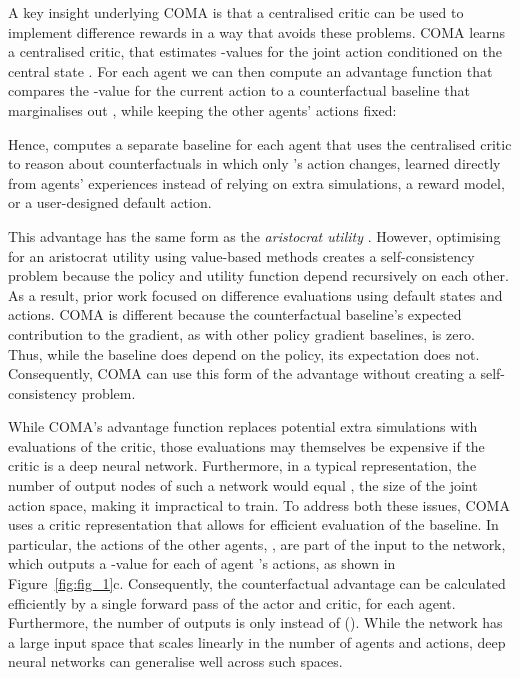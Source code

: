 \documentclass[letterpaper]{article}
\newcommand{\citep}{\cite}
\begin{document}
A key insight underlying COMA is that a centralised critic can be used to 
implement difference rewards in a way that avoids these problems.  COMA learns 
a centralised critic,  that estimates -values for the joint 
action  conditioned on the central state . For each agent  we can 
then compute an advantage function that compares the -value for the current 
action  to a counterfactual baseline that marginalises out , while 
keeping the other agents' actions  fixed:

Hence,  computes a separate baseline for each agent that uses the 
centralised critic to reason about counterfactuals in which only 's action 
changes, learned directly from agents' experiences instead of relying on extra 
simulations, a reward model, or a user-designed default action.

This advantage has the same form as the \emph{aristocrat utility} 
\citep{wolpert2002optimal}. However, optimising for an aristocrat utility using 
value-based methods creates a self-consistency problem because the policy and utility 
function depend recursively on each other. As a result, prior work focused
on difference evaluations using default states and actions. COMA is different because the
 counterfactual baseline's expected contribution to the gradient, as with other policy gradient baselines, is zero.  Thus, while
the baseline does depend on the policy, its expectation does not. Consequently, COMA can use 
this form of the advantage without creating a self-consistency problem.

While COMA's advantage function replaces potential extra simulations with 
evaluations of the critic, those evaluations may themselves be expensive if the 
critic is a deep neural network.  Furthermore, in a typical representation, the 
number of output nodes of such a network would equal , the 
size of the joint action space, making it impractical to train.  To address 
both these issues, COMA uses a critic representation that allows for efficient 
evaluation of the baseline. In particular, the actions of the other agents, 
, are part of the input to the network, which outputs a -value 
for each of agent 's actions, as shown in Figure~\ref{fig:fig_1}c. 
Consequently, the counterfactual advantage can be calculated efficiently by a 
single forward pass of the actor and critic, for each agent. Furthermore, the 
number of outputs is only  instead of (). 
While the network has a large input space that scales linearly in the number of 
agents and actions, deep neural networks can generalise well across such spaces.
\end{document}
